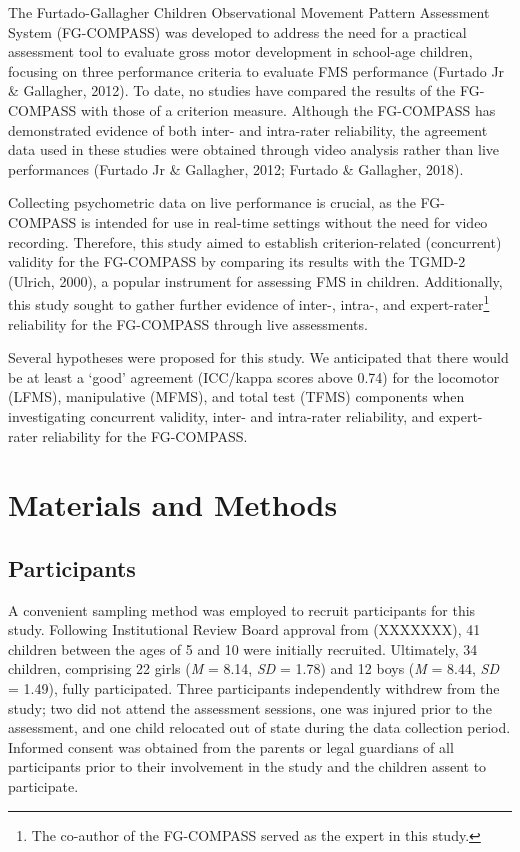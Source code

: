 \documentclass[
  man,
  colorlinks=true,linkcolor=blue,citecolor=blue,urlcolor=blue]{apa7}
\begin{document}
The Furtado-Gallagher Children Observational Movement Pattern Assessment
System (FG-COMPASS) was developed to address the need for a practical
assessment tool to evaluate gross motor development in school-age
children, focusing on three performance criteria to evaluate FMS
performance (Furtado Jr \& Gallagher, 2012). To date, no studies have
compared the results of the FG-COMPASS with those of a criterion
measure. Although the FG-COMPASS has demonstrated evidence of both
inter- and intra-rater reliability, the agreement data used in these
studies were obtained through video analysis rather than live
performances (Furtado Jr \& Gallagher, 2012; Furtado \& Gallagher,
2018).

Collecting psychometric data on live performance is crucial, as the
FG-COMPASS is intended for use in real-time settings without the need
for video recording. Therefore, this study aimed to establish
criterion-related (concurrent) validity for the FG-COMPASS by comparing
its results with the TGMD-2 (Ulrich, 2000), a popular instrument for
assessing FMS in children. Additionally, this study sought to gather
further evidence of inter-, intra-, and expert-rater\footnote{The
  co-author of the FG-COMPASS served as the expert in this study.}
reliability for the FG-COMPASS through live assessments.

Several hypotheses were proposed for this study. We anticipated that
there would be at least a `good' agreement (ICC/kappa scores above 0.74)
for the locomotor (LFMS), manipulative (MFMS), and total test (TFMS)
components when investigating concurrent validity, inter- and
intra-rater reliability, and expert-rater reliability for the
FG-COMPASS.

\section{Materials and Methods}\label{materials-and-methods}

\subsection{Participants}\label{participants}

A convenient sampling method was employed to recruit participants for
this study. Following Institutional Review Board approval from
(XXXXXXX), 41 children between the ages of 5 and 10 were initially
recruited. Ultimately, 34 children, comprising 22 girls (\emph{M} =
8.14, \emph{SD} = 1.78) and 12 boys (\emph{M} = 8.44, \emph{SD} = 1.49),
fully participated. Three participants independently withdrew from the
study; two did not attend the assessment sessions, one was injured prior
to the assessment, and one child relocated out of state during the data
collection period. Informed consent was obtained from the parents or
legal guardians of all participants prior to their involvement in the
study and the children assent to participate.
\end{document}
